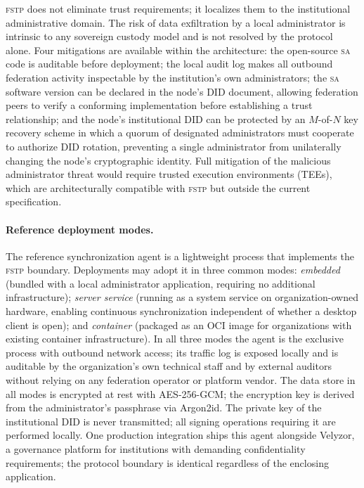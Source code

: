 \documentclass[12pt]{article}
\newcommand{\SA}{\textsc{sa}}
\newcommand{\FSTP}{\textsc{fstp}}
\begin{document}
	\FSTP{} does not eliminate trust requirements; it localizes them to
	the institutional administrative domain. The risk of data exfiltration
	by a local administrator is intrinsic to any sovereign custody model
	and is not resolved by the protocol alone. Four mitigations are
	available within the architecture: the open-source \SA{} code is
	auditable before deployment; the local audit log makes all outbound
	federation activity inspectable by the institution's own
	administrators; the \SA{} software version can be declared in the
	node's DID document, allowing federation peers to verify a conforming
	implementation before establishing a trust relationship; and the
	node's institutional DID can be protected by an $M$-of-$N$ key
	recovery scheme in which a quorum of designated administrators must
	cooperate to authorize DID rotation, preventing a single administrator
	from unilaterally changing the node's cryptographic identity. Full
	mitigation of the malicious administrator threat would require trusted
	execution environments (TEEs), which are architecturally compatible
	with \FSTP{} but outside the current specification.

	\paragraph{Reference deployment modes.}
	
	The reference synchronization agent is a lightweight process that
	implements the \FSTP{} boundary. Deployments may adopt it in three
	common modes: \emph{embedded} (bundled with a local administrator
	application, requiring no additional infrastructure); \emph{server
	service} (running as a system service on organization-owned hardware,
	enabling continuous synchronization independent of whether a desktop
	client is open); and \emph{container} (packaged as an OCI image for
	organizations with existing container infrastructure). In all three
	modes the agent is the exclusive process with outbound network access;
	its traffic log is exposed locally and is auditable by the
	organization's own technical staff and by external auditors without
	relying on any federation operator or platform vendor. The data store
	in all modes is encrypted at rest with AES-256-GCM; the encryption key
	is derived from the administrator's passphrase via Argon2id. The
	private key of the institutional DID is never transmitted; all signing
	operations requiring it are performed locally. One production
	integration ships this agent alongside Velyzor, a governance platform
	for institutions with demanding confidentiality requirements; the
	protocol boundary is identical regardless of the enclosing application.
	
\end{document}
